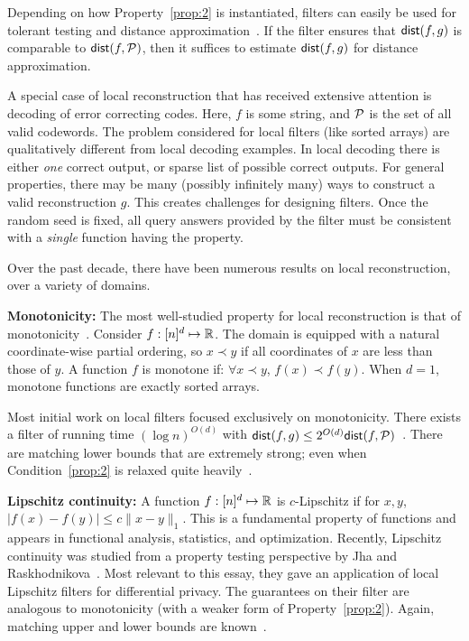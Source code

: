 \documentclass[natbib]{svcyclop}
\def\dist{{\sf dist}}
\begin{document}
Depending on how Property~\ref{prop:2} is instantiated, filters
can easily be used for tolerant testing and distance approximation~\cite{PRR04}. If the filter ensures
that $\dist(f,g)$ is comparable to $\dist(f,\cP)$, then it suffices to estimate $\dist(f,g)$
for distance approximation. 
%

A special case of local reconstruction that has received extensive attention is decoding of error correcting codes. 
Here, $f$ is some string, and $\mathcal{P}$ is the set of all valid codewords. 
The problem considered for local filters (like sorted arrays)
are qualitatively different from local decoding examples.
In local decoding there is either \emph{one} correct output, or 
sparse list of possible correct outputs. For general properties,
there may be many (possibly infinitely many) ways
to construct a valid reconstruction $g$. This creates challenges
for designing filters. Once the random seed is fixed, all query answers
provided by the filter must be consistent with a {\em single} function
having the property.



\KeyRes

Over the past decade, there have been numerous results on local reconstruction,
over a variety of domains. 

{\bf Monotonicity:} The most well-studied property for local reconstruction
is that of monotonicity~\cite{ACCL2,SS06,BhGr+12,AwJh+12}. Consider $f:[n]^d \mapsto \mathbb{R}$. The domain
is equipped with a natural coordinate-wise partial ordering, so $x \prec y$
if all coordinates of $x$ are less than those of $y$. A function $f$
is monotone if: $\forall x \prec y$, $f(x) \prec f(y)$. When $d=1$,
monotone functions are exactly sorted arrays.

Most initial work on local filters focused exclusively on monotonicity.
There exists a filter of running
time $(\log n)^{O(d)}$ with $\dist(f,g) \leq 2^{O(d)}\dist(f,\cP)$~\cite{SS06}.
There are matching lower bounds that are extremely strong; even when Condition~\ref{prop:2}
is relaxed quite heavily~\cite{AwJh+12}.

{\bf Lipschitz continuity:} A function $f:[n]^d \mapsto \mathbb{R}$ is $c$-Lipschitz
if for $x,y$, $|f(x) - f(y)| \leq c\|x-y\|_1$. This is a fundamental property
of functions and appears in functional analysis, statistics, and optimization.
Recently, Lipschitz continuity was studied from a property testing perspective by Jha and Raskhodnikova~\cite{JhRa13}.
Most relevant to this essay, they gave an application of local Lipschitz filters
for differential privacy. The guarantees on their filter are analogous to monotonicity
(with a weaker form of Property~\ref{prop:2}). Again, matching upper and lower bounds
are known~\cite{JhRa13,AwJh+12-2}.
\end{document}
